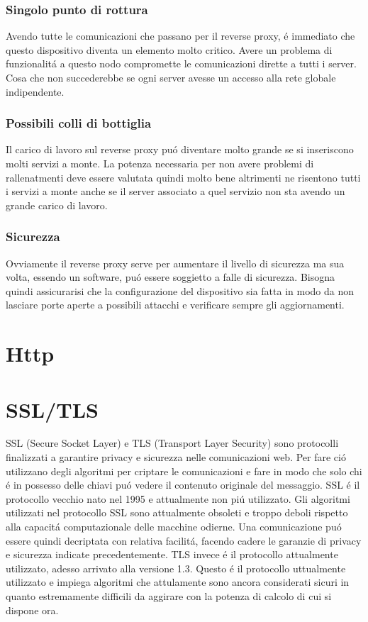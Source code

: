 \subsubsection{Singolo punto di rottura}
Avendo tutte le comunicazioni che passano per il reverse proxy, é immediato che questo dispositivo diventa un elemento molto critico. Avere un problema di funzionalitá a questo nodo compromette le comunicazioni dirette a tutti i server. Cosa che non succederebbe se ogni server avesse un accesso alla rete globale indipendente.
\subsubsection{Possibili colli di bottiglia}
Il carico di lavoro sul reverse proxy puó diventare molto grande se si inseriscono molti servizi a monte. La potenza necessaria per non avere problemi di rallenatmenti deve essere valutata quindi molto bene altrimenti ne risentono tutti i servizi a monte anche se il server associato a quel servizio non sta avendo un grande carico di lavoro.
\subsubsection{Sicurezza}
Ovviamente il reverse proxy serve per aumentare il livello di sicurezza ma sua volta, essendo un software, puó essere soggietto a falle di sicurezza. Bisogna quindi assicurarisi che la configurazione del dispositivo sia fatta in modo da non lasciare porte aperte a possibili attacchi e verificare sempre gli aggiornamenti.


\section{Http}


\section{SSL/TLS}
\cite{tls}SSL (Secure Socket Layer) e TLS (Transport Layer Security) sono protocolli finalizzati a garantire privacy e sicurezza nelle comunicazioni web. Per fare ció utilizzano degli algoritmi per criptare le comunicazioni e fare in modo che solo chi é in possesso delle chiavi puó vedere il contenuto originale del messaggio. SSL é il protocollo vecchio nato nel 1995 e attualmente non piú utilizzato. Gli algoritmi utilizzati nel protocollo SSL sono attualmente obsoleti e troppo deboli rispetto alla capacitá computazionale delle macchine odierne. Una comunicazione puó essere quindi decriptata con relativa facilitá, facendo cadere le garanzie di privacy e sicurezza indicate precedentemente. TLS invece é il protocollo attualmente utilizzato, adesso arrivato alla versione 1.3. Questo é il protocollo uttualmente utilizzato e impiega algoritmi che attulamente sono ancora considerati sicuri in quanto estremamente difficili da aggirare con la potenza di calcolo di cui si dispone ora.
